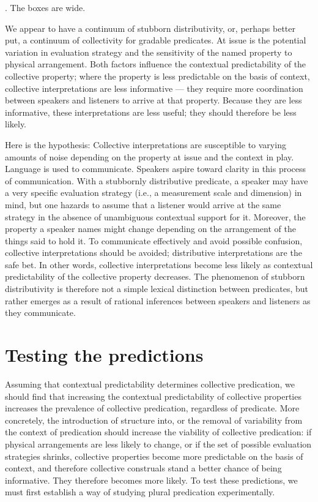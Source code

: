 \documentclass[linguex]{sp}
\begin{document}
\ex. The boxes are wide.

We appear to have a continuum of stubborn distributivity, or, perhaps better put, a continuum of collectivity for gradable predicates. At issue is the potential variation in evaluation strategy and the sensitivity of the named property to physical arrangement. Both factors influence the contextual predictability of the collective property; where the property is less predictable on the basis of context, collective interpretations are less informative --- they require more coordination between speakers and listeners to arrive at that property. Because they are less informative, these interpretations are less useful; they should therefore be less likely.

Here is the hypothesis: Collective interpretations are susceptible to varying amounts of noise depending on the property at issue and the context in play. Language is used to communicate. Speakers aspire toward clarity in this process of communication. With a stubbornly distributive predicate, a speaker may have a very specific evaluation strategy (i.e., a measurement scale and dimension) in mind, but one hazards to assume that a listener would arrive at the same strategy in the absence of unambiguous contextual support for it. Moreover, the property a speaker names might change depending on the arrangement of the things said to hold it. To communicate effectively and avoid possible confusion, collective interpretations should be avoided; distributive interpretations are the safe bet. In other words, collective interpretations become less likely as contextual predictability of the collective property decreases. The phenomenon of stubborn distributivity is therefore not a simple lexical distinction between predicates, but rather emerges as a result of rational inferences between speakers and listeners as they communicate.

\section{Testing the predictions}

Assuming that contextual predictability determines collective predication, we should find that increasing the contextual predictability of collective properties increases the prevalence of collective predication, regardless of predicate. More concretely, the introduction of structure into, or the removal of variability from the context of predication should increase the viability of collective predication: if physical arrangements are less likely to change, or if the set of possible evaluation strategies shrinks, collective properties become more predictable on the basis of context, and therefore collective construals stand a better chance of being informative. They therefore becomes more likely. To test these predictions, we must first establish a way of studying plural predication experimentally.
\end{document}
